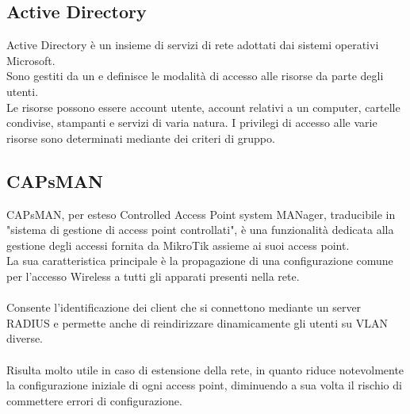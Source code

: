 \documentclass[Tesi.tex]{subfiles}
\begin{document}
\subsection{Active Directory}
Active Directory è un insieme di servizi di rete adottati dai sistemi operativi Microsoft. \\
Sono gestiti da un  e definisce le modalità di accesso alle risorse da parte degli utenti. \\
Le risorse possono essere account utente, account relativi a un computer, cartelle condivise, stampanti e servizi di varia natura. I privilegi di accesso alle varie risorse sono determinati mediante dei criteri di gruppo.

\subsection{CAPsMAN}
CAPsMAN, per esteso Controlled Access Point system MANager, traducibile in "sistema di gestione di access point controllati", è una funzionalità dedicata alla gestione degli accessi fornita da MikroTik assieme ai suoi access point. \\
La sua caratteristica principale è la propagazione di una configurazione comune per l'accesso Wireless a tutti gli apparati presenti nella rete. \\\\
Consente l'identificazione dei client che si connettono mediante un server RADIUS e permette anche di reindirizzare dinamicamente gli utenti su VLAN diverse. \\\\
Risulta molto utile in caso di estensione della rete, in quanto riduce notevolmente la configurazione iniziale di ogni access point, diminuendo a sua volta il rischio di commettere errori di configurazione.
\end{document}
